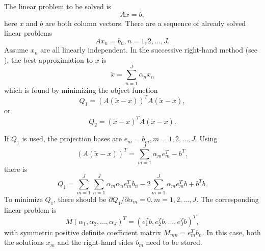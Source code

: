 The linear problem to be solved is
\begin{equation}\label{eq:linearEquationNew}
A x = b,
\end{equation}
here $x$ and $b$ are both column vectors.
There are a sequence of  already solved linear problems
\begin{equation}\label{eq:linearEquationOld}
A x_n = b_n, n = 1, 2, ..., J.
\end{equation}
Assume $x_n$ are all linearly independent.
In the successive right-hand method (see \cite{FISCHER1998193}), the best approximation to $x$ is
\begin{equation}\label{eq:approximate}
\tilde{x}=\sum_{n=1}^J\alpha_n x_n
\end{equation}
which is found by minimizing the object function
\begin{equation}\label{eq:objectFunction1}
Q_1 = \left(A(\tilde{x}-x)\right)^TA(\tilde{x}-x),
\end{equation}
or
\begin{equation}\label{eq:objectFunction2}
Q_2 = (\tilde{x}-x)^TA(\tilde{x}-x).
\end{equation}

If $Q_1$ is used, the projection bases are $e_m = b_m, m = 1, 2, ..., J$. Using
\begin{equation}\label{eq:Atildex}
\left(A(\tilde{x}-x) \right)^T= \sum_{m=1}^J\alpha_me_m^T - b^T,
\end{equation}
there is
\begin{equation}\label{eq:objectFunctionQ1_v2}
Q_1= \sum_{m=1}^J\sum_{n=1}^J\alpha_m\alpha_n e_m^T b_n - 2 \sum_{m=1}^J \alpha_m e_m^T b + b^T b.
\end{equation}
To minimize $Q_1$, there should be $\partial Q_1/\partial \alpha_m =0, m=1, 2, ..., J$.
The corresponding linear problem is
\begin{equation}\label{eq:objectFunctionQ1_solution}
M (\alpha_1, \alpha_2, ..., \alpha_J)^T =   (e_1^Tb, e_2^Tb, ..., e_J^Tb)^T,
\end{equation}
with symmetric positive definite coefficient matrix $M_{mn}=e_m^T b_n$. In this case, both the solutions $x_m$ and the right-hand sides $b_m$ need to be stored.

